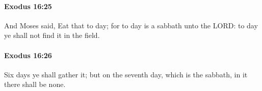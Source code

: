 		\paragraph{Exodus 16:25} %
			\label{EXODUS-16-25}

			And Moses said, Eat that to day; for to day is a sabbath unto the LORD: to day ye shall not find it in the field.


		\paragraph{Exodus 16:26} %
			\label{EXODUS-16-26}

			Six days ye shall gather it; but on the seventh day, which is the sabbath, in it there shall be none.


